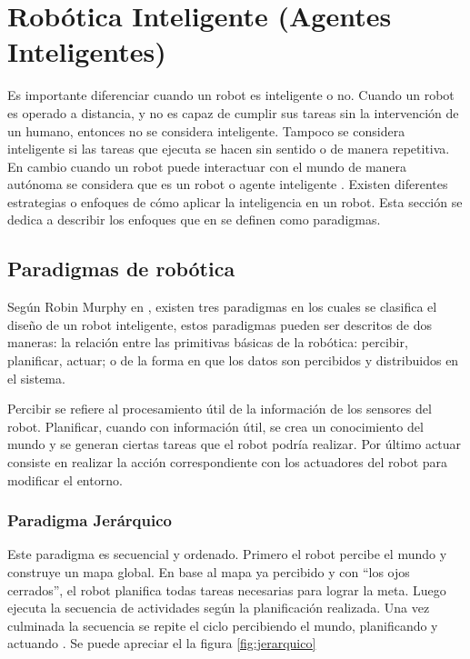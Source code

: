 \section{Robótica Inteligente (Agentes Inteligentes)} \label{sect:AgentesInteligentes}

Es importante diferenciar cuando un robot es inteligente o no. Cuando un robot es operado a distancia, y no es capaz de cumplir sus tareas sin la intervención de un humano, entonces no se considera  inteligente. Tampoco se considera inteligente si las tareas que ejecuta se hacen sin sentido o de manera repetitiva. En cambio cuando un robot puede interactuar con el mundo de manera autónoma se considera que es un robot o agente inteligente \cite{AiRobotics}. Existen diferentes estrategias o enfoques de cómo aplicar la inteligencia en un robot. Esta sección se dedica a describir los enfoques que en  \cite{AiRobotics} se definen como paradigmas. 
   
\subsection{Paradigmas de robótica}
Según Robin Murphy en \cite{AiRobotics}, existen tres paradigmas en los cuales se clasifica el diseño de un robot inteligente, estos paradigmas pueden ser descritos de dos maneras: la relación entre las primitivas básicas de la robótica:  percibir, planificar, actuar; o de la forma en que los datos son percibidos y distribuidos en el sistema.

Percibir se refiere al procesamiento útil de la información de los sensores del robot. Planificar, cuando con información útil, se crea un conocimiento del mundo y se generan ciertas tareas que el robot podría realizar. Por último actuar consiste en realizar la acción correspondiente con los actuadores del robot para modificar el entorno. 

\subsubsection{Paradigma Jerárquico}

Este paradigma es secuencial y ordenado. Primero el robot percibe el mundo y construye un mapa global. En base al mapa ya percibido y con “los ojos cerrados”, el robot planifica todas tareas necesarias para lograr la meta. Luego ejecuta la secuencia de actividades según la planificación realizada. Una vez culminada la secuencia se repite el ciclo percibiendo el mundo, planificando y actuando \cite{AiRobotics}.
Se puede apreciar el la figura \ref{fig:jerarquico}

